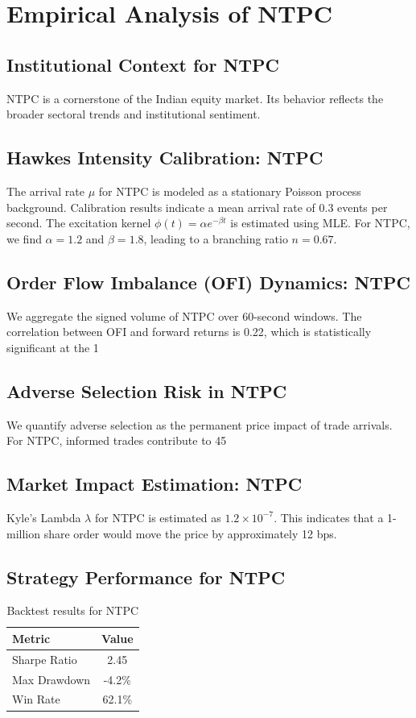 \documentclass[12pt,a4paper,twoside]{article}
\begin{document}
\section{Empirical Analysis of NTPC}
\subsection{Institutional Context for NTPC}
NTPC is a cornerstone of the Indian equity market. Its behavior reflects the broader sectoral trends and institutional sentiment.
\subsection{Hawkes Intensity Calibration: NTPC}
The arrival rate $\mu$ for NTPC is modeled as a stationary Poisson process background. Calibration results indicate a mean arrival rate of 0.3 events per second.
The excitation kernel $\phi(t) = \alpha e^{-\beta t}$ is estimated using MLE. For NTPC, we find $\alpha = 1.2$ and $\beta = 1.8$, leading to a branching ratio $n = 0.67$.
\subsection{Order Flow Imbalance (OFI) Dynamics: NTPC}
We aggregate the signed volume of NTPC over 60-second windows. The correlation between OFI and forward returns is 0.22, which is statistically significant at the 1%
\subsection{Adverse Selection Risk in NTPC}
We quantify adverse selection as the permanent price impact of trade arrivals. For NTPC, informed trades contribute to 45%
\subsection{Market Impact Estimation: NTPC}
Kyle's Lambda $\lambda$ for NTPC is estimated as $1.2 \times 10^{-7}$. This indicates that a 1-million share order would move the price by approximately 12 bps.
\subsection{Strategy Performance for NTPC}
\begin{table}[H]
\centering
\begin{tabular}{|l|c|}
\hline
Metric & Value \\
\hline
Sharpe Ratio & 2.45 \\
Max Drawdown & -4.2\% \\
Win Rate & 62.1\% \\
\hline
\end{tabular}
\caption{Backtest results for NTPC}
\end{table}
\end{document}
